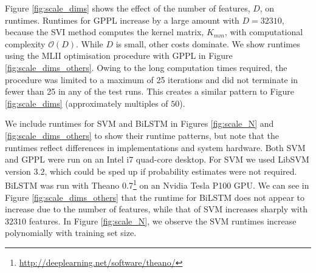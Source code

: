 Figure \ref{fig:scale_dims} shows the effect of the number of features, $D$, on runtimes.  
Runtimes for GPPL increase by a large amount with $D=32310$,
 because the SVI method computes the kernel matrix, $K_{mm}$, with computational complexity $\mathcal{O}(D)$. 
 While $D$ is small, other costs dominate. 
We show runtimes using the MLII optimisation procedure with GPPL in Figure \ref{fig:scale_dims_others}. 
Owing to the long computation times required, the procedure was limited to
a maximum of 25 iterations and did not terminate in fewer than 25 in any of the test runs. 
This creates a similar pattern to Figure \ref{fig:scale_dims} (approximately multiples of $50$).

We include runtimes for SVM and BiLSTM in Figures \ref{fig:scale_N} and
\ref{fig:scale_dims_others} to show their runtime patterns, but note that the runtimes reflect differences in implementations and system hardware.
Both SVM and GPPL were run on an Intel i7 quad-core desktop. For SVM we used LibSVM version 3.2, which could be sped up if probability estimates were not required.
BiLSTM was run with Theano 0.7\footnote{\url{http://deeplearning.net/software/theano/}} on an Nvidia Tesla P100 GPU. 
We can see in Figure \ref{fig:scale_dims_others} that the runtime for BiLSTM does
not appear to increase due to the number of features, while that of SVM increases sharply with $32310$ features. 
In Figure \ref{fig:scale_N}, we observe the SVM runtimes increase polynomially with training set size. 

